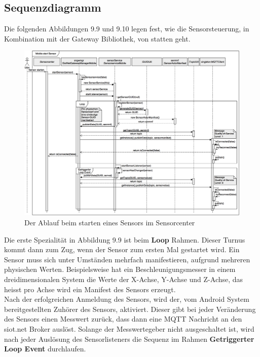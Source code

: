 \subsection{Sequenzdiagramm}
Die folgenden Abbildungen 9.9 und 9.10 legen fest, wie die Sensorsteuerung, in Kombination mit der Gateway Bibliothek, von statten geht.
\begin{figure}[H]
  \centering
  \includegraphics[scale=0.22]{98_Bilder/09_Konzept/01_SequenzdiagrammSensorstartSiotSensorcenter}
  \caption[siot.net Sensorcenter Sequenzdiagramm Sensor starten 1]{Der Ablauf beim starten eines Sensors im Sensorcenter}
\end{figure}
Die erste Spezialität in Abbildung 9.9 ist beim \textbf{Loop} Rahmen. Dieser Turnus kommt dann zum Zug, wenn der Sensor zum ersten Mal gestartet wird. Ein Sensor muss sich unter Umständen mehrfach manifestieren, aufgrund mehreren physischen Werten. Beispielsweise hat ein Beschleunigungsmesser in einem dreidimensionalen System die Werte der X-Achse, Y-Achse und Z-Achse, das heisst pro Achse wird ein Manifest des Sensors erzeugt.\\
Nach der erfolgreichen Anmeldung des Sensors, wird der, vom Android System bereitgestellten Zuhörer des Sensors, aktiviert. Dieser gibt bei jeder Veränderung des Sensors einen Messwert zurück, dass dann eine \gls{MQTT} Nachricht an den siot.net Broker auslöst. Solange der Messwertegeber nicht ausgeschaltet ist, wird nach jeder Auslösung des Sensorlisteners die Sequenz im Rahmen \textbf{Getriggerter Loop Event} durchlaufen.
